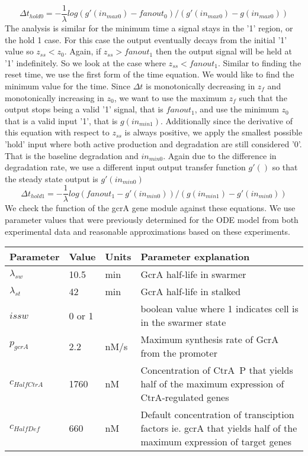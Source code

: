 \documentclass{article}
\begin{document}
\[\Delta t_{hold0}= -\frac{1}{\lambda} log(g'(in_{max0}) -fanout_0)/(g'(in_{max0}) -g(in_{max0}))				
\]
The analysis is similar for the minimum time a signal stays in the '1' region, or the hold 1 case.  For this case the output eventually decays from the initial '1' value so $z_{ss}<z_0$. Again, if $z_{ss}>fanout_1$ then the output signal will be held at '1' indefinitely. So we look at the case where $z_{ss}<fanout_1$.  Similar to finding the reset time, we use the first form of the time equation.   We would like to find the minimum value for the time.  Since $\Delta t$ is monotonically decreasing in $z_f$ and monotonically increasing in $z_0$, we want to use the maximum $z_f$ such that the output stops being a valid '1' signal, that is $fanout_1$, and use the minimum $z_0$ that is a valid input '1', that is $g(in_{min1})$.  Additionally since the derivative of this equation with respect to $z_{ss}$ is always positive, we apply the smallest possible 'hold' input where both active production and degradation are still considered '0'.  That is the baseline degradation and $in_{min0}$.  Again due to the difference in degradation rate, we use a different input output transfer function $g'()$ so that the steady state output is $g'(in_{min0})$  
\[\Delta t_{hold1}= -\frac{1}{\lambda} log(fanout_1 -g'(in_{min0}))/(g(in_{min1}) -g'(in_{min0}))
\]
We check the function of the gcrA gene module against these equations.  We use parameter values that were previously determined for the ODE model from both experimental data and reasonable approximations based on these experiments.  
\begin{center}

\begin{tabular}{|p{1.8cm}|p{1cm}|p{1cm}|p{7cm}| } 
 \hline
\textbf{Parameter} & \textbf{Value} & \textbf{Units} & \textbf{Parameter explanation} \\
\hline
$\lambda_{sw}$ & 10.5 & min & GcrA half-life in swarmer \\ 
\hline
$\lambda_{st}$ & 42 & min & GcrA half-life in stalked \\ 
\hline
$issw$ & 0 or 1 & & boolean value where 1 indicates cell is in the swarmer state \\
\hline
$p_{gcrA}$ & 2.2 & nM/s & Maximum synthesis rate of GcrA from the promoter \\ 
\hline
$c_{HalfCtrA}$ & 1760 & nM & Concentration of CtrA~P that yields half of the maximum expression of CtrA-regulated genes\\
\hline
$c_{HalfDef}$ & 660 & nM & Default concentration of transciption factors ie. gcrA that yields half of the maximum expression of target genes\\
\hline
\end{tabular}

\end{center}
\end{document}
